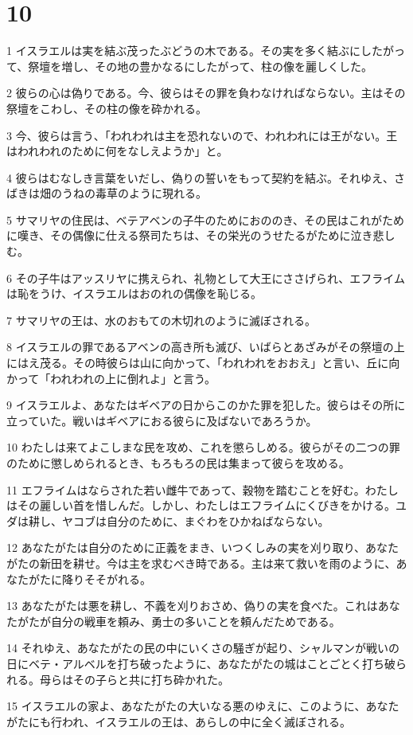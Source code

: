 \chapter{10}

\par 1 イスラエルは実を結ぶ茂ったぶどうの木である。その実を多く結ぶにしたがって、祭壇を増し、その地の豊かなるにしたがって、柱の像を麗しくした。
\par 2 彼らの心は偽りである。今、彼らはその罪を負わなければならない。主はその祭壇をこわし、その柱の像を砕かれる。
\par 3 今、彼らは言う、「われわれは主を恐れないので、われわれには王がない。王はわれわれのために何をなしえようか」と。
\par 4 彼らはむなしき言葉をいだし、偽りの誓いをもって契約を結ぶ。それゆえ、さばきは畑のうねの毒草のように現れる。
\par 5 サマリヤの住民は、ベテアベンの子牛のためにおののき、その民はこれがために嘆き、その偶像に仕える祭司たちは、その栄光のうせたるがために泣き悲しむ。
\par 6 その子牛はアッスリヤに携えられ、礼物として大王にささげられ、エフライムは恥をうけ、イスラエルはおのれの偶像を恥じる。
\par 7 サマリヤの王は、水のおもての木切れのように滅ぼされる。
\par 8 イスラエルの罪であるアベンの高き所も滅び、いばらとあざみがその祭壇の上にはえ茂る。その時彼らは山に向かって、「われわれをおおえ」と言い、丘に向かって「われわれの上に倒れよ」と言う。
\par 9 イスラエルよ、あなたはギベアの日からこのかた罪を犯した。彼らはその所に立っていた。戦いはギベアにおる彼らに及ばないであろうか。
\par 10 わたしは来てよこしまな民を攻め、これを懲らしめる。彼らがその二つの罪のために懲しめられるとき、もろもろの民は集まって彼らを攻める。
\par 11 エフライムはならされた若い雌牛であって、穀物を踏むことを好む。わたしはその麗しい首を惜しんだ。しかし、わたしはエフライムにくびきをかける。ユダは耕し、ヤコブは自分のために、まぐわをひかねばならない。
\par 12 あなたがたは自分のために正義をまき、いつくしみの実を刈り取り、あなたがたの新田を耕せ。今は主を求むべき時である。主は来て救いを雨のように、あなたがたに降りそそがれる。
\par 13 あなたがたは悪を耕し、不義を刈りおさめ、偽りの実を食べた。これはあなたがたが自分の戦車を頼み、勇士の多いことを頼んだためである。
\par 14 それゆえ、あなたがたの民の中にいくさの騒ぎが起り、シャルマンが戦いの日にベテ・アルベルを打ち破ったように、あなたがたの城はことごとく打ち破られる。母らはその子らと共に打ち砕かれた。
\par 15 イスラエルの家よ、あなたがたの大いなる悪のゆえに、このように、あなたがたにも行われ、イスラエルの王は、あらしの中に全く滅ぼされる。

